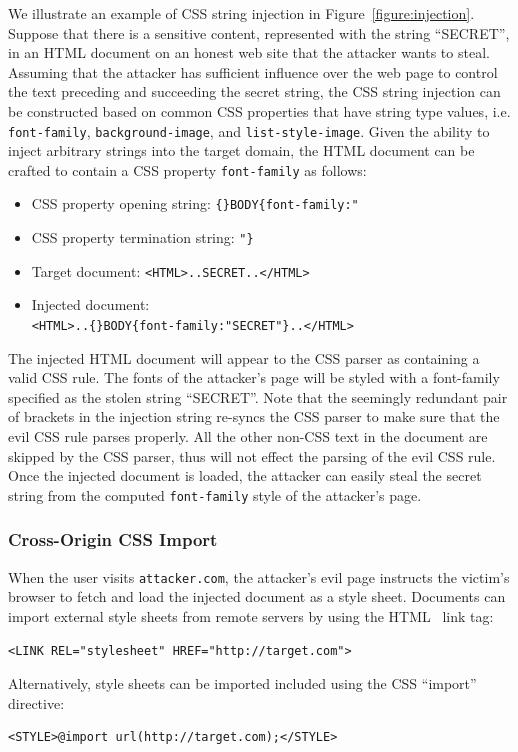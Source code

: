 \documentclass{acm_proc_article-sp}
\begin{document}
We illustrate an example of CSS string injection in Figure~\ref{figure:injection}. Suppose that there is a sensitive content, represented with the string ``SECRET'', in an HTML document on an honest web site that the attacker wants to steal. Assuming that the attacker has sufficient influence over the web page to control the text preceding and succeeding the secret string, the CSS string injection can be constructed based on common CSS properties that have string type values, i.e. \texttt{font-family}, \texttt{background-image}, and \texttt{list-style-image}. Given the ability to inject arbitrary strings into the target domain, the HTML document can be crafted to contain a CSS property \texttt{font-family} as follows:
\begin{itemize}
\item CSS property opening string: \verb|{}BODY{font-family:"|
\item CSS property termination string: \verb|"}|
\item Target document: \verb|<HTML>..SECRET..</HTML>|
\item Injected document: \\
\verb|<HTML>..{}BODY{font-family:"SECRET"}..</HTML>|
\end{itemize}
The injected HTML document will appear to the CSS parser as containing a valid CSS rule. The fonts of the attacker's page will be styled with a font-family specified as the stolen string ``SECRET''. Note that the seemingly redundant pair of brackets in the injection string re-syncs the CSS parser to make sure that the evil CSS rule parses properly. All the other non-CSS text in the document are skipped by the CSS parser, thus will not effect the parsing of the evil CSS rule. Once the injected document is loaded, the attacker can easily steal the secret string from the computed \texttt{font-family} style of the attacker's page.

\subsubsection{Cross-Origin CSS Import}
When the user visits \texttt{attacker.com}, the attacker's evil page instructs the victim's browser to fetch and load the injected document as a style sheet. Documents can import external style sheets from remote servers by using the HTML~\cite{html} link tag:
\begin{verbatim}
<LINK REL="stylesheet" HREF="http://target.com">
\end{verbatim}
Alternatively, style sheets can be imported included using the CSS ``import'' directive:
\begin{verbatim}
<STYLE>@import url(http://target.com);</STYLE>
\end{verbatim}
\end{document}
